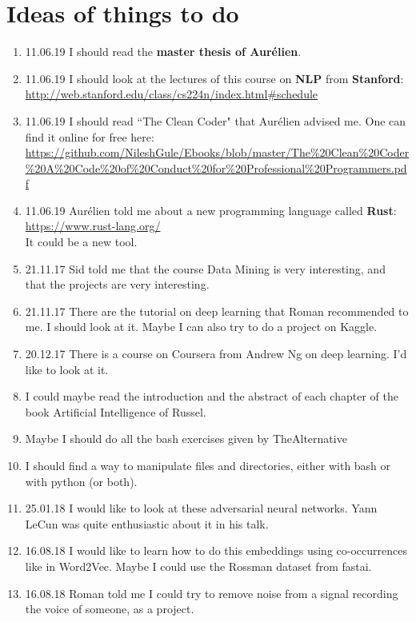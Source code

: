 \documentclass[11pt,a4paper]{article}
\begin{document}
\section{Ideas of things to do}
\begin{enumerate}
\item 11.06.19 I should read the \textbf{master thesis of Aurélien}.
\item 11.06.19 I should look at the lectures of this course on \textbf{NLP} from \textbf{Stanford}:\\
\url{http://web.stanford.edu/class/cs224n/index.html#schedule}
\item 11.06.19 I should read ``The Clean Coder" that Aurélien advised me. One can find it online for free here:\\
\url{https://github.com/NileshGule/Ebooks/blob/master/The%20Clean%20Coder%20A%20Code%20of%20Conduct%20for%20Professional%20Programmers.pdf}
\item 11.06.19 Aurélien told me about a new programming language called \textbf{Rust}:\\
\url{https://www.rust-lang.org/}\\
It could be a new tool.
\item 21.11.17 Sid told me that the course Data Mining is very interesting, and that the projects are very interesting.
\item 21.11.17 There are the tutorial on deep learning that Roman recommended to me. I should look at it. Maybe I can also try to do a project on Kaggle.
\item 20.12.17 There is a course on Coursera from Andrew Ng on deep learning. I'd like to look at it.
\item I could maybe read the introduction and the abstract of each chapter of the book Artificial Intelligence of Russel.
\item Maybe I should do all the bash exercises given by TheAlternative
\item I should find a way to manipulate files and directories, either with bash or with python (or both).
\item 25.01.18 I would like to look at these adversarial neural networks. Yann LeCun was quite enthusiastic about it in his talk.
\item 16.08.18 I would like to learn how to do this embeddings using co-occurrences like in Word2Vec. Maybe I could use the Rossman dataset from fastai.
\item 16.08.18 Roman told me I could try to remove noise from a signal recording the voice of someone, as a project.
\end{enumerate}
\end{document}
